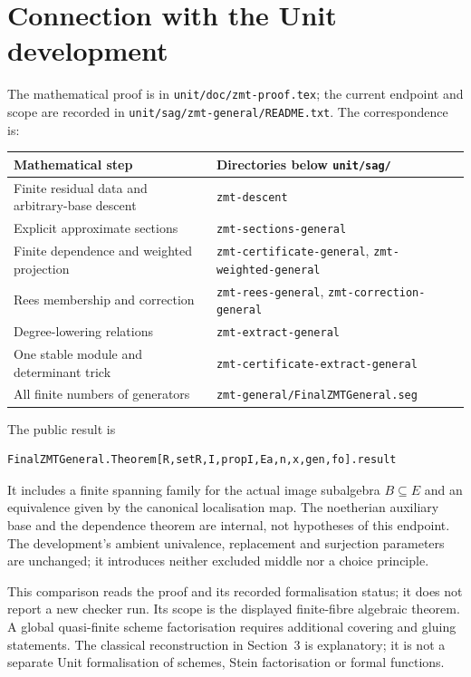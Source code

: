 \documentclass[11pt]{amsart}
\newcommand{\code}[1]{\texttt{#1}}
\begin{document}
\section{Connection with the Unit development}

The mathematical proof is in \code{unit/doc/zmt-proof.tex}; the
current endpoint and scope are recorded in
\code{unit/sag/zmt-general/README.txt}. The correspondence is:

{\small
\begin{longtable}{>{\raggedright\arraybackslash}p{}
                  >{\raggedright\arraybackslash}p{}}
\toprule
Mathematical step & Directories below \code{unit/sag/}\\
\midrule
\endhead
Finite residual data and arbitrary-base descent & \code{zmt-descent}\\
Explicit approximate sections & \code{zmt-sections-general}\\
Finite dependence and weighted projection & \code{zmt-certificate-general},
 \code{zmt-weighted-general}\\
Rees membership and correction & \code{zmt-rees-general},
 \code{zmt-correction-general}\\
Degree-lowering relations & \code{zmt-extract-general}\\
One stable module and determinant trick & \code{zmt-certificate-extract-general}\\
All finite numbers of generators & \code{zmt-general/FinalZMTGeneral.seg}\\
\bottomrule
\end{longtable}}

The public result is
\begin{verbatim}
FinalZMTGeneral.Theorem[R,setR,I,propI,Ea,n,x,gen,fo].result
\end{verbatim}
It includes a finite spanning family for the actual image subalgebra
$B\subseteq E$ and an equivalence given by the canonical localisation
map. The noetherian auxiliary base and the dependence theorem are
internal, not hypotheses of this endpoint. The development's ambient
univalence, replacement and surjection parameters are unchanged;
it introduces neither excluded middle nor a choice principle.

This comparison reads the proof and its recorded formalisation status;
it does not report a new checker run. Its scope is the displayed
finite-fibre algebraic theorem. A global quasi-finite scheme
factorisation requires additional covering and gluing statements.
The classical reconstruction in Section~3 is explanatory; it is not
a separate Unit formalisation of schemes, Stein factorisation or
formal functions.
\end{document}

